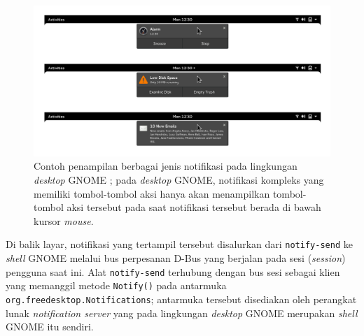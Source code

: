 \begin{figure}
    \centering
    \includegraphics[width=1\linewidth]{assets/banners-expanded.png}
    \caption{Contoh penampilan berbagai jenis notifikasi pada lingkungan \textit{desktop} GNOME \cite{gnome-hig-notifications}; pada \textit{desktop} GNOME, notifikasi kompleks yang memiliki tombol-tombol aksi hanya akan menampilkan tombol-tombol aksi tersebut pada saat notifikasi tersebut berada di bawah kursor \textit{mouse}.}
    \label{example-of-notification-with-action-buttons-on-gnome-desktop}
\end{figure}

Di balik layar, notifikasi yang tertampil tersebut disalurkan dari \verb|notify-send| ke \textit{shell} GNOME melalui bus perpesanan D-Bus yang berjalan pada sesi (\textit{session}) pengguna saat ini. Alat \verb|notify-send| terhubung dengan bus sesi sebagai klien yang memanggil metode \verb|Notify()| pada antarmuka \verb|org.freedesktop.Notifications|; antarmuka tersebut disediakan oleh perangkat lunak \textit{notification server} yang pada lingkungan \textit{desktop} GNOME merupakan \textit{shell} GNOME itu sendiri.

